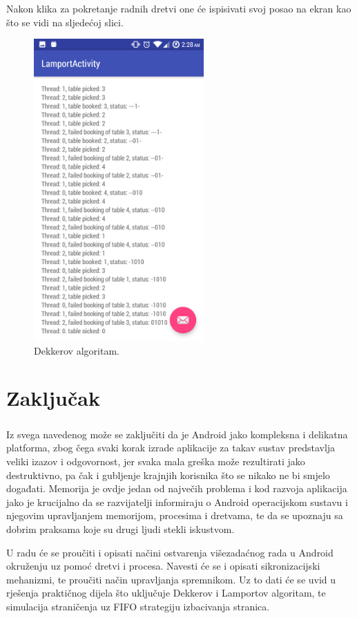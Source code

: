 \documentclass[times, utf8, zavrsni]{fer}
\begin{document}
Nakon klika za pokretanje radnih dretvi one će ispisivati svoj posao na ekran kao što  se vidi na sljedećoj slici.

\begin{figure}[ht!]
\centering
\includegraphics[width=65mm]{img/LamportActivity.png}
\caption{Dekkerov algoritam.}
\label{overflow}
\end{figure}

\chapter{Zaključak}
\paragraph{}
Iz svega navedenog može se zaključiti da je Android jako kompleksna i delikatna platforma, zbog čega svaki korak izrade aplikacije za takav sustav predstavlja veliki izazov i odgovornost, jer svaka mala greška može rezultirati jako destruktivno, pa čak i gubljenje krajnjih korisnika što se nikako ne bi smjelo događati. Memorija je ovdje jedan od največih problema i kod razvoja aplikacija jako je krucijalno da se razvijatelji informiraju o Android operacijskom sustavu i njegovim upravljanjem memorijom, procesima i dretvama, te da se upoznaju sa dobrim praksama koje su drugi ljudi stekli iskustvom.



\begin{sazetak}
U radu će se proučiti i opisati načini ostvarenja višezadaćnog rada u Android okruženju uz pomoć dretvi i procesa. Navesti će se i opisati sikronizacijski mehanizmi, te proučiti način upravljanja spremnikom. Uz to dati će se uvid u rješenja praktičnog dijela što uključuje Dekkerov i Lamportov algoritam, te simulacija straničenja uz FIFO strategiju izbacivanja stranica.

\end{sazetak}
\end{document}
